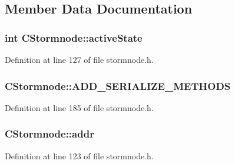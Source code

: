 \subsection{Member Data Documentation}
\hypertarget{class_c_stormnode_a288aca8c8cbd786c2188ae5bc39c642a}{}
\subsubsection[{active\+State}]{\setlength{\rightskip}{0pt plus 5cm}int C\+Stormnode\+::active\+State}\label{class_c_stormnode_a288aca8c8cbd786c2188ae5bc39c642a}


Definition at line 127 of file stormnode.\+h.

\hypertarget{class_c_stormnode_a7dabb832beef5f761352a4799c55bbec}{}
\subsubsection[{A\+D\+D\+\_\+\+S\+E\+R\+I\+A\+L\+I\+Z\+E\+\_\+\+M\+E\+T\+H\+O\+D\+S}]{\setlength{\rightskip}{0pt plus 5cm}C\+Stormnode\+::\+A\+D\+D\+\_\+\+S\+E\+R\+I\+A\+L\+I\+Z\+E\+\_\+\+M\+E\+T\+H\+O\+D\+S}\label{class_c_stormnode_a7dabb832beef5f761352a4799c55bbec}


Definition at line 185 of file stormnode.\+h.

\hypertarget{class_c_stormnode_a31e0681a92d1f4d0da756b680c695d66}{}
\subsubsection[{addr}]{ C\+Stormnode\+::addr}\label{class_c_stormnode_a31e0681a92d1f4d0da756b680c695d66}


Definition at line 123 of file stormnode.\+h.

\hypertarget{class_c_stormnode_a1d256b346d4bee1e4d7a68db4c5e659f}{}
